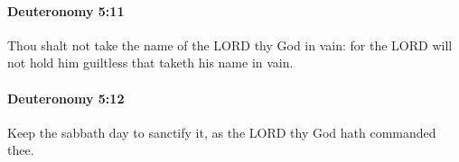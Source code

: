 		\paragraph{Deuteronomy 5:11} %
			\label{DEUTERONOMY-5-11}

			Thou shalt not take the name of the LORD thy God in vain: for the LORD will not hold him guiltless that taketh his name in vain.


		\paragraph{Deuteronomy 5:12} %
			\label{DEUTERONOMY-5-12}

			Keep the sabbath day to sanctify it, as the LORD thy God hath commanded thee.


